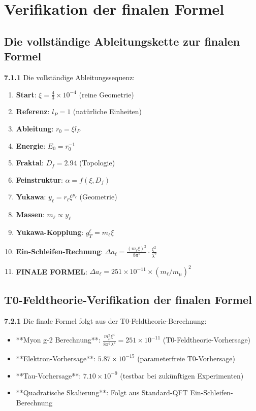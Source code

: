 \documentclass[12pt,a4paper]{article}
\newcommand{\lP}{l_P}
\newcommand{\rzero}{r_0}
\newcommand{\Ezero}{E_0}
\newcommand{\xipar}{\xi}
\begin{document}
	\section{Verifikation der finalen Formel}
	
	\subsection{Die vollständige Ableitungskette zur finalen Formel}
	
	\noindent \textbf{7.1.1} Die vollständige Ableitungssequenz:
	\begin{enumerate}
		\item \textbf{Start}: $\xipar = \frac{4}{3} \times 10^{-4}$ (reine Geometrie)
		\item \textbf{Referenz}: $\lP = 1$ (natürliche Einheiten)
		\item \textbf{Ableitung}: $\rzero = \xipar \lP$
		\item \textbf{Energie}: $\Ezero = \rzero^{-1}$
		\item \textbf{Fraktal}: $D_f = 2.94$ (Topologie)
		\item \textbf{Feinstruktur}: $\alpha = f(\xipar, D_f)$
		\item \textbf{Yukawa}: $y_\ell = r_\ell \xipar^{p_\ell}$ (Geometrie)
		\item \textbf{Massen}: $m_\ell \propto y_\ell$
		\item \textbf{Yukawa-Kopplung}: $g_T^\ell = m_\ell \xi$
		\item \textbf{Ein-Schleifen-Rechnung}: $\Delta a_\ell = \frac{(m_\ell \xi)^2}{8\pi^2} \cdot \frac{\xi^2}{\lambda^2}$
		\item \textbf{FINALE FORMEL}: $\Delta a_\ell = 251 \times 10^{-11} \times (m_\ell/m_\mu)^2$
	\end{enumerate}
	
	\subsection{T0-Feldtheorie-Verifikation der finalen Formel}
	
	\noindent \textbf{7.2.1} Die finale Formel folgt aus der T0-Feldtheorie-Berechnung:
	\begin{itemize}
		\item **Myon g-2 Berechnung**: $\frac{m_\mu^2 \xi^4}{8\pi^2 \lambda^2} = 251 \times 10^{-11}$ (T0-Feldtheorie-Vorhersage)
		\item **Elektron-Vorhersage**: $5.87 \times 10^{-15}$ (parameterfreie T0-Vorhersage)
		\item **Tau-Vorhersage**: $7.10 \times 10^{-9}$ (testbar bei zukünftigen Experimenten)
		\item **Quadratische Skalierung**: Folgt aus Standard-QFT Ein-Schleifen-Berechnung
	\end{itemize}
	
\end{document}
